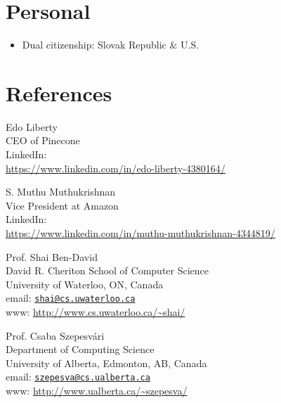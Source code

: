 \documentclass[9pt]{article}
\begin{document}
\section*{Personal}

\begin{itemize}
\item Dual citizenship: Slovak Republic \& U.S.
\end{itemize}

\section*{References}
%
\begin{minipage}[t]{9cm}
Edo Liberty \\
CEO of Pinecone \\
LinkedIn: \\
\url{https://www.linkedin.com/in/edo-liberty-4380164/}
\end{minipage}
%
\begin{minipage}[t]{9cm}
S. Muthu Muthukrishnan \\
Vice President at Amazon \\
LinkedIn: \\
\url{https://www.linkedin.com/in/muthu-muthukrishnan-4344819/}
\end{minipage}

\vspace{1cm}

\noindent
\begin{minipage}[t]{9cm}
Prof. Shai Ben-David \\
David R. Cheriton School of Computer Science \\
University of Waterloo, ON, Canada \\
email: \href{mailto:shai@cs.uwaterloo.ca}{\texttt{shai@cs.uwaterloo.ca}} \\
www: \url{http://www.cs.uwaterloo.ca/~shai/}
\end{minipage}
%
\begin{minipage}[t]{9cm}
Prof. Csaba Szepesv\'ari \\
Department of Computing Science \\
University of Alberta, Edmonton, AB, Canada \\
email: \href{mailto:szepesva@cs.ualberta.ca}{\texttt{szepesva@cs.ualberta.ca}} \\
www: \url{http://www.ualberta.ca/~szepesva/}
\end{minipage}


\renewcommand{\refname}{Publications}
\nocite{*}


\end{document}
